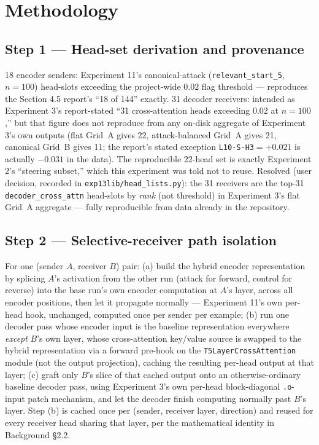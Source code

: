 \documentclass[11pt]{article}
\begin{document}
\section{Methodology}

\subsection{Step 1 --- Head-set derivation and provenance}
18 encoder senders: Experiment 11's canonical-attack (\texttt{relevant\_start\_5},
$n{=}100$) head-slots exceeding the project-wide $0.02$ flag threshold —
reproduces the Section 4.5 report's ``18 of 144'' exactly.
31 decoder receivers: intended as Experiment 3's report-stated ``31 cross-attention
heads exceeding 0.02 at $n{=}100$,'' but that figure does not reproduce from
any on-disk aggregate of Experiment 3's own outputs (flat Grid~A gives 22,
attack-balanced Grid~A gives 21, canonical Grid~B gives 11; the report's
stated exception \texttt{L10-S-H3}$=+0.021$ is actually $-0.031$ in the data).
The reproducible 22-head set is exactly Experiment 2's ``steering subset,''
which this experiment was told not to reuse. Resolved (user decision,
recorded in \texttt{exp13lib/head\_lists.py}): the 31 receivers are the
top-31 \texttt{decoder\_cross\_attn} head-slots by \emph{rank} (not threshold)
in Experiment 3's flat Grid~A aggregate — fully reproducible from data already
in the repository.

\subsection{Step 2 --- Selective-receiver path isolation}
For one (sender $A$, receiver $B$) pair: (a) build the hybrid encoder
representation by splicing $A$'s activation from the other run (attack for
forward, control for reverse) into the base run's own encoder computation at
$A$'s layer, across all encoder positions, then let it propagate normally —
Experiment 11's own per-head hook, unchanged, computed once per sender per
example; (b) run one decoder pass whose encoder input is the baseline
representation everywhere \emph{except} $B$'s own layer, whose cross-attention
key/value source is swapped to the hybrid representation via a forward
pre-hook on the \texttt{T5LayerCrossAttention} module (not the output
projection), caching the resulting per-head output at that layer; (c) graft
only $B$'s slice of that cached output onto an otherwise-ordinary baseline
decoder pass, using Experiment 3's own per-head block-diagonal
\texttt{.o}-input patch mechanism, and let the decoder finish computing
normally past $B$'s layer. Step (b) is cached once per (sender, receiver
layer, direction) and reused for every receiver head sharing that layer, per
the mathematical identity in Background \S2.2.
\end{document}

